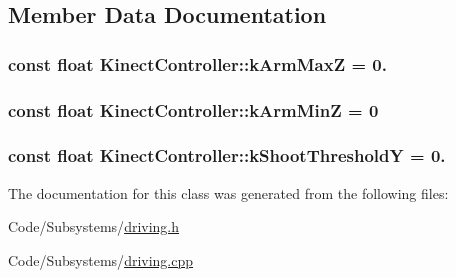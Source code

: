 \subsection{\-Member \-Data \-Documentation}
\hypertarget{class_kinect_controller_ac390f64bbcf37bc8b6be9818fa311742}{
\subsubsection[{k\-Arm\-Max\-Z}]{\setlength{\rightskip}{0pt plus 5cm}const float {\bf \-Kinect\-Controller\-::k\-Arm\-Max\-Z} = 0.}}\label{class_kinect_controller_ac390f64bbcf37bc8b6be9818fa311742}
\hypertarget{class_kinect_controller_ae6ebf9beca402ce50fe7e69c8f8c1a99}{
\subsubsection[{k\-Arm\-Min\-Z}]{\setlength{\rightskip}{0pt plus 5cm}const float {\bf \-Kinect\-Controller\-::k\-Arm\-Min\-Z} = 0}}\label{class_kinect_controller_ae6ebf9beca402ce50fe7e69c8f8c1a99}
\hypertarget{class_kinect_controller_a56ff6743ed6d8e2508ddd682d13749ce}{
\subsubsection[{k\-Shoot\-Threshold\-Y}]{\setlength{\rightskip}{0pt plus 5cm}const float {\bf \-Kinect\-Controller\-::k\-Shoot\-Threshold\-Y} = 0.}}\label{class_kinect_controller_a56ff6743ed6d8e2508ddd682d13749ce}


\-The documentation for this class was generated from the following files\-:\begin{DoxyCompactItemize}
\item 
\-Code/\-Subsystems/\hyperlink{driving_8h}{driving.\-h}\item 
\-Code/\-Subsystems/\hyperlink{driving_8cpp}{driving.\-cpp}\end{DoxyCompactItemize}

